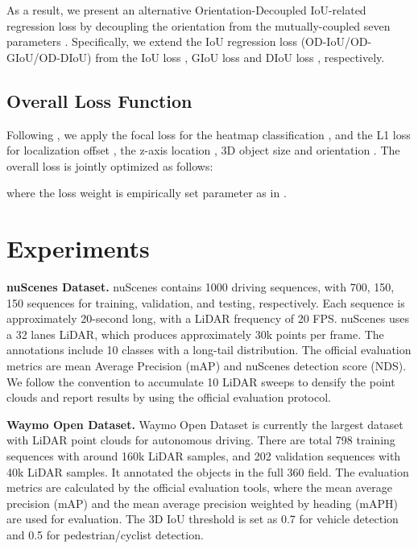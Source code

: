 \documentclass[runningheads]{llncs}
\begin{document}
As a result, we present an alternative Orientation-Decoupled IoU-related regression loss by decoupling the orientation  from the mutually-coupled seven parameters .
Specifically, we extend the IoU regression loss  (OD-IoU/OD-GIoU/OD-DIoU) from the IoU loss \cite{rezatofighi2019generalized}, GIoU loss \cite{rezatofighi2019generalized} and DIoU loss \cite{zheng2020distance}, respectively.


\subsection{Overall Loss Function}

Following \cite{yin2021center}, we apply the focal loss \cite{lin2017focal} for the heatmap classification , and the L1 loss for localization offset , the z-axis location , 3D object size  and orientation .
The overall loss  is jointly optimized as follows:

where the loss weight  is empirically set parameter as in \cite{yin2021center}.


\section{Experiments}
\label{sec:experiment}

{\flushleft \bf nuScenes Dataset.}
nuScenes \cite{caesar2020nuscenes} contains 1000 driving sequences, with 700, 150, 150 sequences for training, validation, and testing, respectively. Each sequence is approximately 20-second long, with a LiDAR frequency of 20 FPS. 
nuScenes uses a 32 lanes LiDAR, which produces approximately 30k points per frame. The annotations include 10 classes with a long-tail distribution. The official evaluation metrics are mean Average Precision (mAP) and nuScenes detection score (NDS). 
We follow the convention to accumulate 10 LiDAR sweeps to densify the point clouds and report results by using the official evaluation protocol.

{\flushleft \bf Waymo Open Dataset.}
Waymo Open Dataset \cite{sun2020scalability} is currently the largest dataset with LiDAR point clouds for autonomous driving. There are total 798 training sequences with around 160k LiDAR samples, and 202 validation sequences with 40k LiDAR samples. It annotated the objects in the full 360 field. The evaluation metrics are calculated by the official evaluation tools, where the mean average precision (mAP) and the mean average precision weighted by heading (mAPH) are used for evaluation. The 3D IoU threshold is set as 0.7 for vehicle detection and 0.5 for pedestrian/cyclist detection. 
\end{document}
